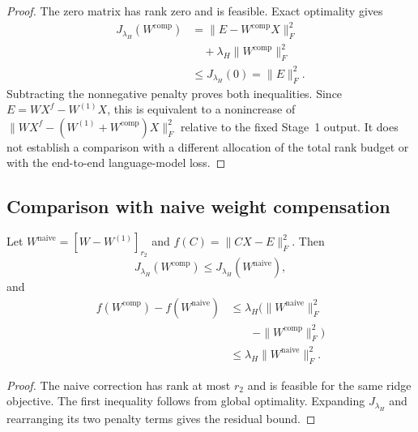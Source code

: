 \begin{proof}
The zero matrix has rank zero and is feasible. Exact optimality gives
\begin{equation}
\begin{aligned}
J_{\lambda_H}(W^{\mathrm{comp}})
&=\|E-W^{\mathrm{comp}}X\|_F^2\\
&\quad+\lambda_H\|W^{\mathrm{comp}}\|_F^2\\
&\le J_{\lambda_H}(0)=\|E\|_F^2.
\end{aligned}
\end{equation}
Subtracting the nonnegative penalty proves both inequalities. Since $E=WX^f-W^{(1)}X$, this is equivalent to a nonincrease of $\|WX^f-(W^{(1)}+W^{\mathrm{comp}})X\|_F^2$ relative to the fixed Stage~1 output. It does not establish a comparison with a different allocation of the total rank budget or with the end-to-end language-model loss.
\end{proof}

\subsection{Comparison with naive weight compensation}\label{sup:proof-corollary1}

\begin{corollary*}
Let $W^{\mathrm{naive}}=[W-W^{(1)}]_{r_2}$ and $f(C)=\|CX-E\|_F^2$. Then
\begin{equation}
J_{\lambda_H}(W^{\mathrm{comp}})
\le J_{\lambda_H}(W^{\mathrm{naive}}),
\end{equation}
and
\begin{equation}
\begin{aligned}
f(W^{\mathrm{comp}})-f(W^{\mathrm{naive}})
&\le\lambda_H\big(\|W^{\mathrm{naive}}\|_F^2 \\
&\qquad-\|W^{\mathrm{comp}}\|_F^2\big) \\
&\le\lambda_H\|W^{\mathrm{naive}}\|_F^2.
\end{aligned}
\end{equation}
\end{corollary*}

\begin{proof}
The naive correction has rank at most $r_2$ and is feasible for the same ridge objective. The first inequality follows from global optimality. Expanding $J_{\lambda_H}$ and rearranging its two penalty terms gives the residual bound.
\end{proof}

